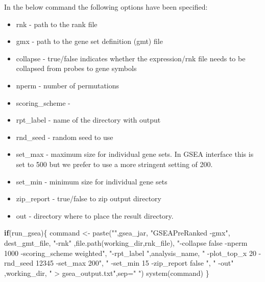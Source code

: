 \documentclass[
]{book}
\newenvironment{Shaded}{\begin{snugshade}}{\end{snugshade}}
\newcommand{\AttributeTok}[1]{\textcolor[rgb]{0.77,0.63,0.00}{#1}}
\newcommand{\ControlFlowTok}[1]{\textcolor[rgb]{0.13,0.29,0.53}{\textbf{#1}}}
\newcommand{\FunctionTok}[1]{\textcolor[rgb]{0.00,0.00,0.00}{#1}}
\newcommand{\NormalTok}[1]{#1}
\newcommand{\OtherTok}[1]{\textcolor[rgb]{0.56,0.35,0.01}{#1}}
\newcommand{\StringTok}[1]{\textcolor[rgb]{0.31,0.60,0.02}{#1}}
\providecommand{\tightlist}{%
  \setlength{\itemsep}{0pt}\setlength{\parskip}{0pt}}
\begin{document}
In the below command the following options have been specified:

\begin{itemize}
\tightlist
\item
  rnk - path to the rank file
\item
  gmx - path to the gene set definition (gmt) file
\item
  collapse - true/false indicates whether the expression/rnk file needs to be collapsed from probes to gene symbols
\item
  nperm - number of permutations
\item
  scoring\_scheme -
\item
  rpt\_label - name of the directory with output
\item
  rnd\_seed - random seed to use
\item
  set\_max - maximum size for individual gene sets. In GSEA interface this is set to 500 but we prefer to use a more stringent setting of 200.
\item
  set\_min - minimum size for individual gene sets
\item
  zip\_report - true/false to zip output directory
\item
  out - directory where to place the result directory.
\end{itemize}

\begin{Shaded}
\begin{Highlighting}[]
\ControlFlowTok{if}\NormalTok{(run\_gsea)\{}
\NormalTok{  command }\OtherTok{\textless{}{-}} \FunctionTok{paste}\NormalTok{(}\StringTok{""}\NormalTok{,gsea\_jar,  }
                   \StringTok{"GSEAPreRanked {-}gmx"}\NormalTok{, dest\_gmt\_file, }
                   \StringTok{"{-}rnk"}\NormalTok{ ,}\FunctionTok{file.path}\NormalTok{(working\_dir,rnk\_file), }
                   \StringTok{"{-}collapse false {-}nperm 1000 {-}scoring\_scheme weighted"}\NormalTok{, }
                   \StringTok{"{-}rpt\_label "}\NormalTok{,analysis\_name,}
                   \StringTok{"  {-}plot\_top\_x 20 {-}rnd\_seed 12345  {-}set\_max 200"}\NormalTok{,  }
                   \StringTok{" {-}set\_min 15 {-}zip\_report false "}\NormalTok{,}
                   \StringTok{" {-}out"}\NormalTok{ ,working\_dir, }
                   \StringTok{" \textgreater{} gsea\_output.txt"}\NormalTok{,}\AttributeTok{sep=}\StringTok{" "}\NormalTok{)}
  \FunctionTok{system}\NormalTok{(command)}
\NormalTok{\}}
\end{Highlighting}
\end{Shaded}
\end{document}
